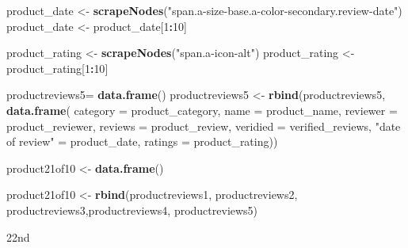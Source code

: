 \documentclass[
]{article}
\newenvironment{Shaded}{\begin{snugshade}}{\end{snugshade}}
\newcommand{\AttributeTok}[1]{\textcolor[rgb]{0.13,0.29,0.53}{#1}}
\newcommand{\DecValTok}[1]{\textcolor[rgb]{0.00,0.00,0.81}{#1}}
\newcommand{\FunctionTok}[1]{\textcolor[rgb]{0.13,0.29,0.53}{\textbf{#1}}}
\newcommand{\NormalTok}[1]{#1}
\newcommand{\OtherTok}[1]{\textcolor[rgb]{0.56,0.35,0.01}{#1}}
\newcommand{\SpecialCharTok}[1]{\textcolor[rgb]{0.81,0.36,0.00}{\textbf{#1}}}
\newcommand{\StringTok}[1]{\textcolor[rgb]{0.31,0.60,0.02}{#1}}
\begin{document}
\begin{Shaded}
\begin{Highlighting}[]
\NormalTok{  product\_date }\OtherTok{\textless{}{-}} \FunctionTok{scrapeNodes}\NormalTok{(}\StringTok{"span.a{-}size{-}base.a{-}color{-}secondary.review{-}date"}\NormalTok{)}
\NormalTok{  product\_date }\OtherTok{\textless{}{-}}\NormalTok{ product\_date[}\DecValTok{1}\SpecialCharTok{:}\DecValTok{10}\NormalTok{]}
  
\NormalTok{  product\_rating }\OtherTok{\textless{}{-}} \FunctionTok{scrapeNodes}\NormalTok{(}\StringTok{"span.a{-}icon{-}alt"}\NormalTok{)}
\NormalTok{  product\_rating }\OtherTok{\textless{}{-}}\NormalTok{ product\_rating[}\DecValTok{1}\SpecialCharTok{:}\DecValTok{10}\NormalTok{]}
  
\NormalTok{  productreviews5}\OtherTok{=} \FunctionTok{data.frame}\NormalTok{()}
\NormalTok{  productreviews5 }\OtherTok{\textless{}{-}} \FunctionTok{rbind}\NormalTok{(productreviews5, }\FunctionTok{data.frame}\NormalTok{(}
                      \AttributeTok{category =}\NormalTok{ product\_category,}
                      \AttributeTok{name =}\NormalTok{ product\_name,}
                      \AttributeTok{reviewer =}\NormalTok{ product\_reviewer,}
                      \AttributeTok{reviews =}\NormalTok{ product\_review,}
                      \AttributeTok{veridied =}\NormalTok{ verified\_reviews,}
                      \StringTok{"date of review"} \OtherTok{=}\NormalTok{ product\_date,}
                      \AttributeTok{ratings =}\NormalTok{ product\_rating))}
  
\NormalTok{  product21of10 }\OtherTok{\textless{}{-}} \FunctionTok{data.frame}\NormalTok{()}
  
\NormalTok{  product21of10 }\OtherTok{\textless{}{-}} \FunctionTok{rbind}\NormalTok{(productreviews1, productreviews2, productreviews3,productreviews4, productreviews5)}
\end{Highlighting}
\end{Shaded}

22nd
\end{document}
